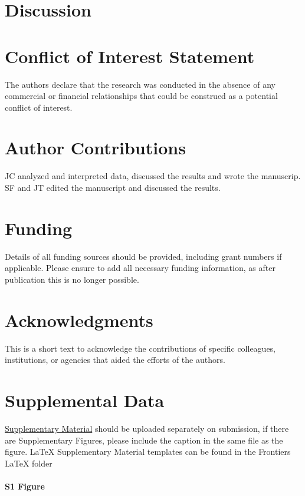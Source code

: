\documentclass{frontiersSCNS}
\begin{document}
\section{Discussion}\label{discussion}

\section*{Conflict of Interest Statement}

The authors declare that the research was conducted in the absence of
any commercial or financial relationships that could be construed as a
potential conflict of interest.

\section*{Author Contributions}

JC analyzed and interpreted data, discussed the results and wrote the
manuscrip. SF and JT edited the manuscript and discussed the results.

\section*{Funding}

Details of all funding sources should be provided, including grant
numbers if applicable. Please ensure to add all necessary funding
information, as after publication this is no longer possible.

\section*{Acknowledgments}

This is a short text to acknowledge the contributions of specific
colleagues, institutions, or agencies that aided the efforts of the
authors.

\section*{Supplemental Data}

\href{http://home.frontiersin.org/about/author-guidelines#SupplementaryMaterial}{Supplementary Material}
should be uploaded separately on submission, if there are Supplementary
Figures, please include the caption in the same file as the figure.
LaTeX Supplementary Material templates can be found in the Frontiers
LaTeX folder

\paragraph*{S1 Figure}
\label{S1_Figure}
\end{document}
